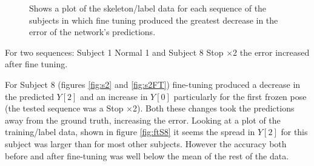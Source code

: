 \documentclass[11pt]{article} %
\begin{document}
\begin{figure}
\centering
{}%
\qquad%
%
\caption{Shows a plot of the skeleton/label data for each sequence of the subjects in which fine tuning produced the greatest decrease in the error of the network's predictions. }
\end{figure}

For two sequences: Subject 1 Normal 1 and Subject 8 Stop $\times$2 the error increased after fine tuning.

For Subject 8 (figures \ref{fig:s2} and \ref{fig:s2FT}) fine-tuning produced a decrease in the predicted $Y[2]$ and an increase in $Y[0]$ particularly for the first frozen pose (the tested sequence was a Stop $\times$2). Both these changes took the predictions away from the ground truth, increasing the error. Looking at a plot of the training/label data, shown in figure \ref{fig:ftS8} it seems the spread in $Y[2]$ for this subject was larger than for most other subjects. However the accuracy both before and after fine-tuning was well below the mean of the rest of the data.
\end{document}
